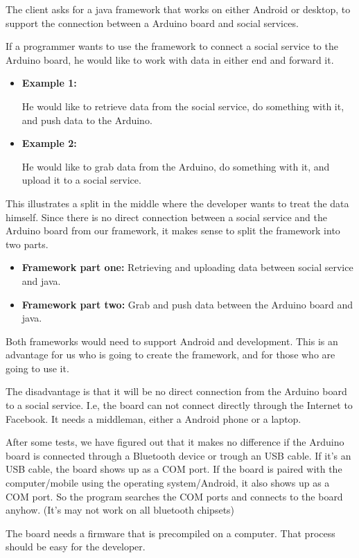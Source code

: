 The client asks for a java framework that works on either Android
or desktop, to support the connection between a Arduino board and
social services.

If a programmer wants to use the framework to connect a social service
to the Arduino board, he would like to work with data in either end
and forward it. 
\begin{itemize}
\item \textbf{Example 1:}


He would like to retrieve data from the social service, do something
with it, and push data to the Arduino.

\item \textbf{Example 2:}


He would like to grab data from the Arduino, do something with it,
and upload it to a social service.

\end{itemize}
This illustrates a split in the middle where the developer wants to
treat the data himself. Since there is no direct connection between
a social service and the Arduino board from our framework, it makes
sense to split the framework into two parts. 
\begin{itemize}
\item \textbf{Framework part one:} Retrieving and uploading data between
social service and java. 
\item \textbf{Framework part two:} Grab and push data between the Arduino
board and java. 
\end{itemize}
Both frameworks would need to support Android and development. This
is an advantage for us who is going to create the framework, and for
those who are going to use it.

The disadvantage is that it will be no direct connection from the
Arduino board to a social service. I.e, the board can not connect
directly through the Internet to Facebook. It needs a middleman, either
a Android phone or a laptop.

After some tests, we have figured out that it makes no difference
if the Arduino board is connected through a Bluetooth device or trough
an USB cable. If it's an USB cable, the board shows up as a COM port.
If the board is paired with the computer/mobile using the operating
system/Android, it also shows up as a COM port. So the program searches
the COM ports and connects to the board anyhow. (It's may not work
on all bluetooth chipsets)

The board needs a firmware that is precompiled on a computer. That
process should be easy for the developer.

